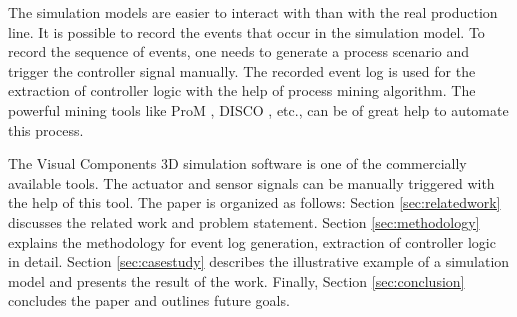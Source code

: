 \begin{bibunit}
The simulation models are easier to interact with than with the real production line. It is possible to record the events that occur in the simulation model. To record the sequence of events, one needs to generate a process scenario and trigger the controller signal manually. The recorded event log is used for the extraction of controller logic with the help of process mining algorithm. The powerful mining tools like ProM \cite{van2005prom}, DISCO \cite{gunther2012disco}, etc., can be of great help to automate this process.

The Visual Components \cite{visualcomponent} 3D simulation software is one of the commercially available tools. The actuator and sensor signals can be manually triggered with the help of this tool. The paper is organized as follows: Section \ref{sec:relatedwork}  discusses the related work and problem statement. Section \ref{sec:methodology} explains the methodology for event log generation, extraction of controller logic in detail. Section \ref{sec:casestudy}  describes the illustrative example of a simulation model and presents the result of the work. Finally, Section \ref{sec:conclusion} concludes the paper and outlines future goals.

\end{bibunit}
